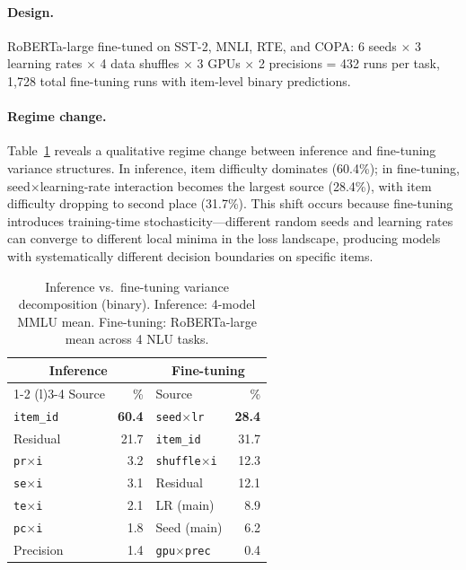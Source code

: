 \documentclass[letterpaper]{article}
\newcommand{\pct}{\%}
\begin{document}
\paragraph{Design.}
RoBERTa-large fine-tuned on SST-2, MNLI, RTE, and COPA: 6 seeds $\times$ 3 learning rates $\times$ 4 data shuffles $\times$ 3 GPUs $\times$ 2 precisions = 432 runs per task, 1,728 total fine-tuning runs with item-level binary predictions.

\paragraph{Regime change.}
Table~\ref{tab:ft-vs-inf} reveals a qualitative regime change between inference and fine-tuning variance structures.
In inference, item difficulty dominates (60.4\pct{}); in fine-tuning, seed$\times$learning-rate interaction becomes the largest source (28.4\pct{}), with item difficulty dropping to second place (31.7\pct{}).
This shift occurs because fine-tuning introduces training-time stochasticity---different random seeds and learning rates can converge to different local minima in the loss landscape, producing models with systematically different decision boundaries on specific items.

\begin{table}[t]
\centering
\caption{Inference vs.\ fine-tuning variance decomposition (binary). Inference: 4-model MMLU mean. Fine-tuning: RoBERTa-large mean across 4 NLU tasks.}
\label{tab:ft-vs-inf}
\small
\begin{tabular}{lrlr}
\toprule
\multicolumn{2}{c}{Inference} & \multicolumn{2}{c}{Fine-tuning} \\
\cmidrule(r){1-2} \cmidrule(l){3-4}
Source & \pct{} & Source & \pct{} \\
\midrule
\texttt{item\_id}  & \textbf{60.4} & \texttt{seed$\times$lr} & \textbf{28.4} \\
Residual            & 21.7 & \texttt{item\_id}  & 31.7 \\
\texttt{pr$\times$i} & 3.2 & \texttt{shuffle$\times$i} & 12.3 \\
\texttt{se$\times$i} & 3.1 & Residual & 12.1 \\
\texttt{te$\times$i} & 2.1 & LR (main) & 8.9 \\
\texttt{pc$\times$i} & 1.8 & Seed (main) & 6.2 \\
Precision            & 1.4 & \texttt{gpu$\times$prec} & 0.4 \\
\bottomrule
\end{tabular}
\end{table}
\end{document}
